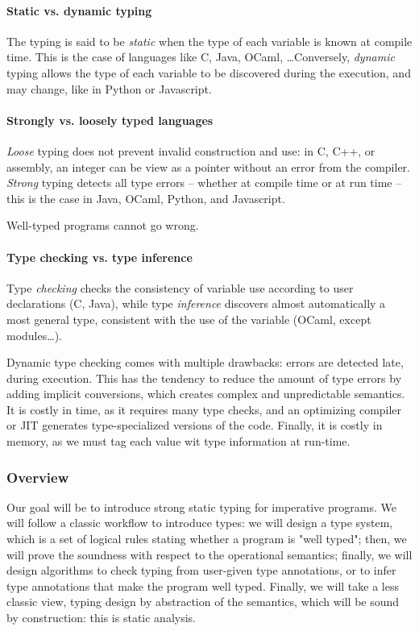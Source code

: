 \documentclass[toc]{../cs-classes/cs-classes}
\begin{document}
\paragraph*{Static vs. dynamic typing}
The typing is said to be \emph{static} when the type of each variable is known at compile time. This is the case of languages like C, Java, OCaml, \dots Conversely, \emph{dynamic} typing allows the type of each variable to be discovered during the execution, and may change, like in Python or Javascript.

\paragraph*{Strongly vs. loosely typed languages}
\emph{Loose} typing does not prevent invalid construction and use: in C, C++, or assembly, an integer can be view as a pointer without an error from the compiler. \emph{Strong} typing detects all type errors -- whether at compile time or at run time -- this is the case in Java, OCaml, Python, and Javascript.

\begin{theorem}
    Well-typed programs cannot go wrong.
\end{theorem}

\paragraph*{Type checking vs. type inference}
Type \emph{checking} checks the consistency of variable use according to user declarations (C, Java), while type \emph{inference} discovers almost automatically a most general type, consistent with the use of the variable (OCaml, except modules\dots).

\begin{example}
    Dynamic type checking comes with multiple drawbacks: errors are detected late, during execution. This has the tendency to reduce the amount of type errors by adding implicit conversions, which creates complex and unpredictable semantics. It is costly in time, as it requires many type checks, and an optimizing compiler or JIT generates type-specialized versions of the code. Finally, it is costly in memory, as we must tag each value wit type information at run-time.
\end{example}

\subsubsection{Overview}
Our goal will be to introduce strong static typing for imperative programs. We will follow a classic workflow to introduce types: we will design a type system, which is a set of logical rules stating whether a program is "well typed"; then, we will prove the soundness with respect to the operational semantics; finally, we will design algorithms to check typing from user-given type annotations, or to infer type annotations that make the program well typed. Finally, we will take a less classic view, typing design by abstraction of the semantics, which will be sound by construction: this is static analysis.
\end{document}
